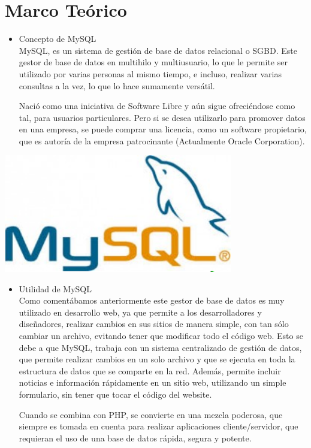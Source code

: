 \section{Marco Teórico} 
\begin{itemize}
\item Concepto de MySQL
\\ MySQL, es un sistema de gestión de base de datos relacional o SGBD. Este gestor de base de datos en multihilo y multiusuario, lo que le permite ser utilizado por varias personas al mismo tiempo, e incluso, realizar varias consultas a la vez, lo que lo hace sumamente versátil.

Nació como una iniciativa de Software Libre y aún sigue ofreciéndose como tal, para usuarios particulares. Pero si se desea utilizarlo para promover datos en una empresa, se puede comprar una licencia, como un software propietario, que es autoría de la empresa patrocinante (Actualmente Oracle Corporation).\\
\end{itemize} 

\begin{itemize}
	\begin{center}
		\includegraphics[width=10cm]{./Imagenes/1a}
		\end{center}
\end{itemize} 

\begin{itemize}
\item Utilidad de MySQL
\\ Como comentábamos anteriormente este gestor de base de datos es muy utilizado en desarrollo web, ya que permite a los desarrolladores y diseñadores, realizar cambios en sus sitios de manera simple, con tan sólo cambiar un archivo, evitando tener que modificar todo el código web. Esto se debe a que MySQL, trabaja con un sistema centralizado de gestión de datos, que permite realizar cambios en un solo archivo y que se ejecuta en toda la estructura de datos que se comparte en la red. Además, permite incluir noticias e información rápidamente en un sitio web, utilizando un simple formulario, sin tener que tocar el código del website.

Cuando se combina con PHP, se convierte en una mezcla poderosa, que siempre es tomada en cuenta para realizar aplicaciones cliente/servidor, que requieran el uso de una base de datos rápida, segura y potente.\\
\end{itemize} 

